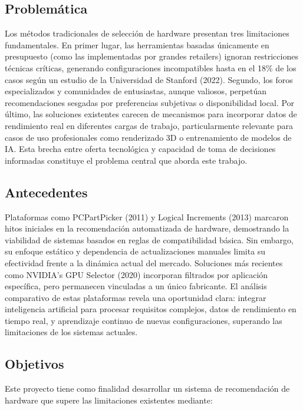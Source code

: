 \documentclass{llncs}
\begin{document}
\subsection{Problemática}
Los métodos tradicionales de selección de hardware presentan tres limitaciones fundamentales. En primer lugar, las herramientas basadas únicamente en presupuesto (como las implementadas por grandes retailers) ignoran restricciones técnicas críticas, generando configuraciones incompatibles hasta en el 18\% de los casos según un estudio de la Universidad de Stanford (2022). Segundo, los foros especializados y comunidades de entusiastas, aunque valiosos, perpetúan recomendaciones sesgadas por preferencias subjetivas o disponibilidad local. Por último, las soluciones existentes carecen de mecanismos para incorporar datos de rendimiento real en diferentes cargas de trabajo, particularmente relevante para casos de uso profesionales como renderizado 3D o entrenamiento de modelos de IA. Esta brecha entre oferta tecnológica y capacidad de toma de decisiones informadas constituye el problema central que aborda este trabajo.

\subsection{Antecedentes}
Plataformas como PCPartPicker (2011) y Logical Increments (2013) marcaron hitos iniciales en la recomendación automatizada de hardware, demostrando la viabilidad de sistemas basados en reglas de compatibilidad básica. Sin embargo, su enfoque estático y dependencia de actualizaciones manuales limita su efectividad frente a la dinámica actual del mercado. Soluciones más recientes como NVIDIA's GPU Selector (2020) incorporan filtrados por aplicación específica, pero permanecen vinculadas a un único fabricante. El análisis comparativo de estas plataformas revela una oportunidad clara: integrar inteligencia artificial para procesar requisitos complejos, datos de rendimiento en tiempo real, y aprendizaje continuo de nuevas configuraciones, superando las limitaciones de los sistemas actuales.

\subsection{Objetivos}
Este proyecto tiene como finalidad desarrollar un sistema de recomendación de hardware que supere las limitaciones existentes mediante:
\end{document}

